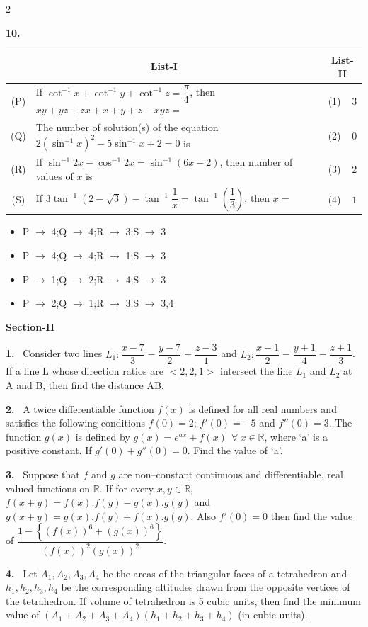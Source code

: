\documentclass[10pt]{extarticle}
\newcommand{\sect}[1]{\par\smallskip\noindent\textbf{#1}\par}
\newcommand{\qn}[1]{\par\smallskip\noindent\textbf{#1.}~}
\newenvironment{qoptions}{\begin{itemize}[leftmargin=1.8em,itemsep=1pt,topsep=2pt,label={}]}{\end{itemize}}
\newcommand{\opt}[2]{\item[(#1)] #2}
\begin{document}
\begin{multicols}{2}
\begin{qoptions}
\end{qoptions}
\columnbreak
\qn{10}\par\nopagebreak[4]
\begin{center}\small\setlength{\tabcolsep}{3pt}
\begin{tabular}{|c|p{4.2cm}|c|c|}
\hline
\multicolumn{2}{|c|}{List-I} & \multicolumn{2}{c|}{List-II}\\ \hline
(P) & If $\cot^{-1}x+\cot^{-1}y+\cot^{-1}z=\dfrac{\pi}{4}$, then $xy+yz+zx+x+y+z-xyz=$ & (1) & $3$\\ \hline
(Q) & The number of solution(s) of the equation $2\left(\sin^{-1}x\right)^2-5\sin^{-1}x+2=0$ is & (2) & $0$\\ \hline
(R) & If $\sin^{-1}2x-\cos^{-1}2x=\sin^{-1}(6x-2)$, then number of values of $x$ is & (3) & $2$\\ \hline
(S) & If $3\tan^{-1}(2-\sqrt3)-\tan^{-1}\dfrac1x=\tan^{-1}\left(\dfrac13\right)$, then $x=$ & (4) & $1$\\ \hline
\end{tabular}
\end{center}
\begin{qoptions}
\opt{A}{P $\to$ 4;Q $\to$ 4;R $\to$ 3;S $\to$ 3}
\opt{B}{P $\to$ 4;Q $\to$ 4;R $\to$ 1;S $\to$ 3}
\opt{C}{P $\to$ 1;Q $\to$ 2;R $\to$ 4;S $\to$ 3}
\opt{D}{P $\to$ 2;Q $\to$ 1;R $\to$ 3;S $\to$ 3,4}
\end{qoptions}
\sect{Section-II}
\qn{1} Consider two lines $L_1:\dfrac{x-7}{3}=\dfrac{y-7}{2}=\dfrac{z-3}{1}$ and $L_2:\dfrac{x-1}{2}=\dfrac{y+1}{4}=\dfrac{z+1}{3}$. If a line L whose direction ratios are $<2,2,1>$ intersect the line $L_1$ and $L_2$ at A and B, then find the distance AB.
\qn{2} A twice differentiable function $f(x)$ is defined for all real numbers and satisfies the following conditions $f(0)=2$; $f'(0)=-5$ and $f''(0)=3$. The function $g(x)$ is defined by $g(x)=e^{ax}+f(x)\ \ \forall\ x\in\mathbb{R}$, where `a' is a positive constant. If $g'(0)+g''(0)=0$. Find the value of `a'.
\qn{3} Suppose that $f$ and $g$ are non--constant continuous and differentiable, real valued functions on $\mathbb{R}$. If for every $x,y\in\mathbb{R}$, $f(x+y)=f(x).f(y)-g(x).g(y)$ and $g(x+y)=g(x).f(y)+f(x).g(y)$. Also $f'(0)=0$ then find the value of $\dfrac{1-\left\{\left(f(x)\right)^6+\left(g(x)\right)^6\right\}}{\left(f(x)\right)^2\left(g(x)\right)^2}$.
\qn{4} Let $A_1,A_2,A_3,A_4$ be the areas of the triangular faces of a tetrahedron and $h_1,h_2,h_3,h_4$ be the corresponding altitudes drawn from the opposite vertices of the tetrahedron. If volume of tetrahedron is 5 cubic units, then find the minimum value of $(A_1+A_2+A_3+A_4)(h_1+h_2+h_3+h_4)$ (in cubic units).

\end{multicols}
\end{document}
